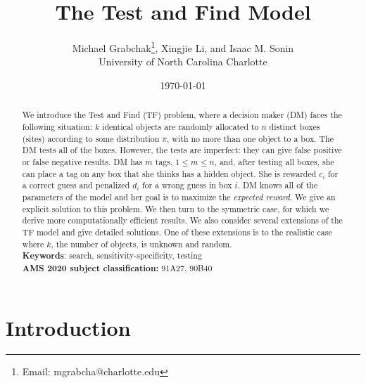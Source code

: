 \documentclass[a4paper,11pt]{article}
\newcommand{\flw}{following }
\begin{document}
\author{Michael Grabchak\footnote{Email: mgrabcha@charlotte.edu}, Xingjie Li, and Isaac M. Sonin \\
University of North Carolina Charlotte}
\title{The Test and Find Model}
\date{\today}
\maketitle

\begin{abstract}
We introduce the Test and Find (TF) problem, where a decision maker (DM) faces the \flw situation: $k$ identical objects are randomly allocated to $n$ distinct boxes (sites) according to some distribution $\pi$, with no more than one object to a box. The DM tests all of the boxes. However, the tests are imperfect: they can give false positive or false negative results. DM has $m$ tags, $1\leq m\leq n$, and, after testing all boxes, she can place a tag on any box that she thinks has a hidden object. She is rewarded $c_i$ for a correct guess and penalized $d_i$ for a wrong guess in box $i$. DM knows all of the parameters of the model and her goal is to maximize the \emph{expected reward}. We give an explicit solution to this problem. We then turn to the symmetric case, for which we derive more computationally efficient results. We also consider several extensions of the TF model and give detailed solutions. One of these extensions is to the realistic case where $k$, the number of objects, is unknown and random.  \\
	
\noindent\textbf{Keywords}: search, sensitivity-specificity, testing\\
	\textbf{AMS 2020 subject classification:} 91A27, 90B40
\end{abstract}

\section{Introduction}\label{sec: INT}
\end{document}
